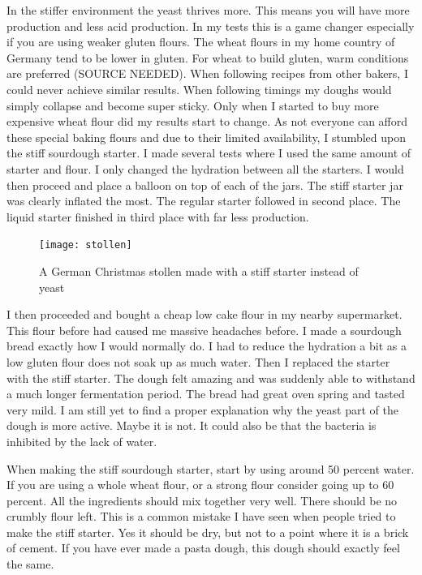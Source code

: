In the stiffer environment the yeast thrives more. This means you will have
more  production and less acid production. In my tests this is a game
changer especially if you are using weaker gluten flours. The wheat flours in
my home country of Germany tend to be lower in gluten. For wheat to build gluten, warm conditions
are preferred (SOURCE NEEDED). When following recipes from other bakers, I
could never achieve similar results. When following timings my doughs would
simply collapse and become super sticky. Only when I started to buy more
expensive wheat flour did my results start to change. As not everyone can afford
these special baking flours and due to their limited availability, I stumbled upon the
stiff sourdough starter. I made several tests where I used the same amount of
starter and flour. I only changed the hydration between all the starters. I
would then proceed and place a balloon on top of each of the jars. The stiff
starter jar was clearly inflated the most. The regular starter
followed in second place. The liquid starter finished in third place with far less 
production.

\begin{figure}[!htb]
  \texttt{[image: stollen]}
  \caption{A German Christmas stollen made with a stiff starter instead of yeast}
  \label{fig:stollen}
\end{figure}

I then proceeded and bought a cheap low cake flour in my nearby supermarket.
This flour before had caused me massive headaches before. I made a sourdough bread
exactly how I would normally do. I had to reduce the hydration a bit as a low
gluten flour does not soak up as much water. Then I replaced the starter with
the stiff starter. The dough felt amazing and was suddenly able to withstand a
much longer fermentation period. The bread had great oven spring and tasted
very mild. I am still yet to find a proper explanation why the yeast part of
the dough is more active. Maybe it is not. It could also be that the bacteria
is inhibited by the lack of water.

When making the stiff sourdough starter, start by using around 50 percent
water. If you are using a whole wheat flour, or a strong flour consider going
up to 60 percent. All the ingredients should mix together very well. There
should be no crumbly flour left. This is a common mistake I have seen when
people tried to make the stiff starter. Yes it should be dry, but not to a
point where it is a brick of cement. If you have ever made a pasta dough, this
dough should exactly feel the same.

